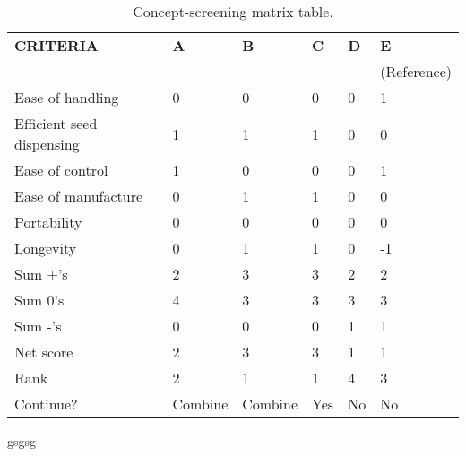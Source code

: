 \begin{landscape} %
    \begin{table}[h]
        \centering
        \caption{Concept-screening matrix table.}
        \renewcommand{\arraystretch}{1.2} %
        \setlength{\tabcolsep}{6pt} %


        \begin{tabular}{l C C C C C}
            \toprule
            \textbf{CRITERIA} & \textbf{A} & \textbf{B} & \textbf{C} & \textbf{D} & \textbf{E} \\ 
            & & & & & (Reference) \\ 
            \midrule
            Ease of handling & 0 & 0 & 0 & 0 & 1 \\
            Efficient seed dispensing & 1 & 1 & 1 & 0 & 0 \\
            Ease of control & 1 & 0 & 0 & 0 & 1 \\
            Ease of manufacture & 0 & 1 & 1 & 0 & 0 \\
            Portability & 0 & 0 & 0 & 0 & 0 \\
            Longevity & 0 & 1 & 1 & 0 & -1 \\
            \midrule
            Sum +’s & 2 & 3 & 3 & 2 & 2 \\
            Sum 0’s & 4 & 3 & 3 & 3 & 3 \\
            Sum -’s & 0 & 0 & 0 & 1 & 1 \\
            \midrule
            Net score & 2 & 3 & 3 & 1 & 1 \\
            Rank & 2 & 1 & 1 & 4 & 3 \\
            Continue? & Combine & Combine & Yes & No & No \\
            \bottomrule
        \end{tabular}
    \end{table}
\end{landscape} %
gsgsg